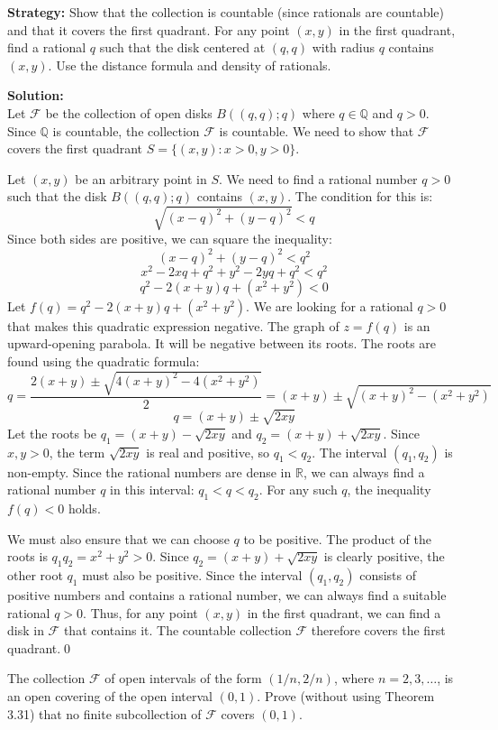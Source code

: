 \noindent\textbf{Strategy:} Show that the collection is countable (since rationals are countable) and that it covers the first quadrant. For any point $(x,y)$ in the first quadrant, find a rational $q$ such that the disk centered at $(q,q)$ with radius $q$ contains $(x,y)$. Use the distance formula and density of rationals.

\bigskip\noindent\textbf{Solution:}\\
Let $\mathcal{F}$ be the collection of open disks $B((q,q); q)$ where $q \in \mathbb{Q}$ and $q > 0$. Since $\mathbb{Q}$ is countable, the collection $\mathcal{F}$ is countable. We need to show that $\mathcal{F}$ covers the first quadrant $S = \{(x, y) : x > 0, y > 0\}$.

Let $(x, y)$ be an arbitrary point in $S$. We need to find a rational number $q > 0$ such that the disk $B((q,q); q)$ contains $(x, y)$. The condition for this is:
$$\sqrt{(x-q)^2 + (y-q)^2} < q$$
Since both sides are positive, we can square the inequality:
$$(x-q)^2 + (y-q)^2 < q^2$$
$$x^2 - 2xq + q^2 + y^2 - 2yq + q^2 < q^2$$
$$q^2 - 2(x+y)q + (x^2+y^2) < 0$$
Let $f(q) = q^2 - 2(x+y)q + (x^2+y^2)$. We are looking for a rational $q > 0$ that makes this quadratic expression negative. The graph of $z=f(q)$ is an upward-opening parabola. It will be negative between its roots. The roots are found using the quadratic formula:
$$q = \frac{2(x+y) \pm \sqrt{4(x+y)^2 - 4(x^2+y^2)}}{2} = (x+y) \pm \sqrt{(x+y)^2 - (x^2+y^2)}$$
$$q = (x+y) \pm \sqrt{2xy}$$
Let the roots be $q_1 = (x+y) - \sqrt{2xy}$ and $q_2 = (x+y) + \sqrt{2xy}$. Since $x,y > 0$, the term $\sqrt{2xy}$ is real and positive, so $q_1 < q_2$. The interval $(q_1, q_2)$ is non-empty.
Since the rational numbers are dense in $\mathbb{R}$, we can always find a rational number $q$ in this interval: $q_1 < q < q_2$. For any such $q$, the inequality $f(q) < 0$ holds.

We must also ensure that we can choose $q$ to be positive. The product of the roots is $q_1 q_2 = x^2+y^2 > 0$. Since $q_2 = (x+y) + \sqrt{2xy}$ is clearly positive, the other root $q_1$ must also be positive.
Since the interval $(q_1, q_2)$ consists of positive numbers and contains a rational number, we can always find a suitable rational $q > 0$.
Thus, for any point $(x,y)$ in the first quadrant, we can find a disk in $\mathcal{F}$ that contains it. The countable collection $\mathcal{F}$ therefore covers the first quadrant.\qed


\begin{problembox}
The collection \( \mathcal{F} \) of open intervals of the form \( (1/n, 2/n) \), where \( n = 2, 3, \ldots \), is an open covering of the open interval \( (0, 1) \). Prove (without using Theorem 3.31) that no finite subcollection of \( \mathcal{F} \) covers \( (0, 1) \).
\end{problembox}

